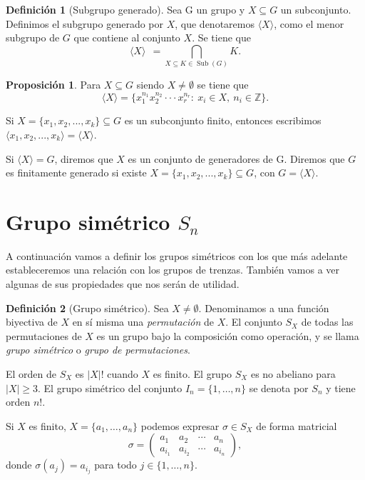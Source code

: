 \documentclass[12pt]{book}
\theoremstyle{definition}
\newtheorem{defi}{Definición}[section]
\newtheorem{prop}{Proposición}[section]
\begin{document}
\begin{defi}[Subgrupo generado]
Sea G un grupo y $X\subseteq G$ un subconjunto. Definimos el subgrupo generado por $X$, que denotaremos $\langle X\rangle$, como el menor subgrupo de $G$ que contiene al conjunto $X$. Se tiene que
$$\langle X\rangle\ \ =\bigcap_{X\subseteq K\in \operatorname{Sub}(G)}K.$$

\end{defi}

\begin{prop}
Para $X\subseteq G$ siendo $X\neq\emptyset$ se tiene que
$$\langle X\rangle = \{x_1^{n_1}x_2^{n_2}\cdot\cdot\cdot x_r^{n_r} :\ x_i\in X,\ n_i\in\mathbb{Z}\}.$$

\end{prop}



Si $X=\{x_1,x_2,...,x_k\}\subseteq G$ es un subconjunto finito, entonces escribimos $\langle x_1,x_2,...,x_k\rangle=\langle X\rangle$.

Si $\langle X\rangle = G$, diremos que $X$ es un conjunto de generadores de G. Diremos que $G$ es finitamente generado si existe $X=\{x_1,x_2,...,x_k\}\subseteq G$, con $G=\langle X\rangle$. 
\newline


\section{Grupo simétrico $S_n$}

A continuación vamos a definir los grupos simétricos con los que más adelante estableceremos una relación con los grupos de trenzas. También vamos a ver algunas de sus propiedades que nos serán de utilidad.

\begin{defi}[Grupo simétrico]
Sea $X \neq \emptyset$. Denominamos a una función biyectiva de $X$ en sí misma una \textit{permutación} de $X$. El conjunto $S_X$ de todas las permutaciones de $X$ es un grupo bajo la composición como operación, y se llama \textit{grupo simétrico} o \textit{grupo de permutaciones}.
\end{defi}

El orden de $S_X$ es $|X|!$ cuando $X$ es finito. El grupo $S_X$ es no abeliano para $|X|\geq 3$. El grupo simétrico del conjunto $I_n=\{1,\ldots,n\}$ se denota por $S_n$ y tiene orden $n!$.

Si $X$ es finito, $X = \{a_1,\ldots,a_n\}$ podemos expresar $\sigma\in S_X$ de forma matricial
$$\sigma = 
\begin{pmatrix}
a_1 & a_2 & \cdots & a_n\\
a_{i_1} & a_{i_2} & \cdots & a_{i_n}
\end{pmatrix}
,$$
donde $\sigma(a_j)=a_{i_j}$ para todo $j\in\{1,\ldots,n\}$.
\end{document}
